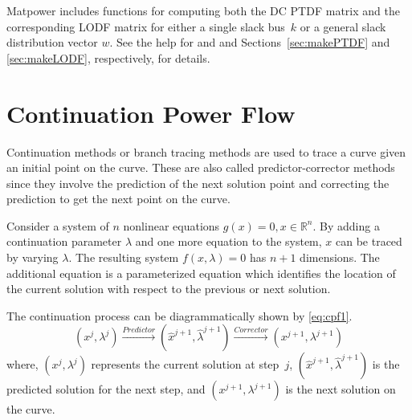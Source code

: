 \documentclass[12pt]{article}
\newcommand{\matpower}[0]{{\sc Matpower}}
\newcommand{\code}[1]{{\relsize{-0.5}{\tt{{#1}}}}}  %
\numberwithin{equation}{section}
\numberwithin{table}{section}
\numberwithin{figure}{section}
\begin{document}
\matpower{} includes functions for computing both the DC PTDF matrix and the corresponding LODF matrix for either a single slack bus~$k$ or a general slack distribution vector $w$. See the help for \code{makePTDF} and \code{makeLODF} and Sections~\ref{sec:makePTDF} and \ref{sec:makeLODF}, respectively, for details.


\clearpage
\section{Continuation Power Flow}

Continuation methods or branch tracing methods are used to trace a curve given an initial point on the curve. These are also called predictor-corrector methods since they involve the prediction of the next solution point and correcting the prediction to get the next point on the curve.

Consider a system of $n$ nonlinear equations $g(x) = 0, x \in \mathbb{R}^n$. By adding a continuation parameter $\lambda$ and one more equation to the system, $x$ can be traced by varying $\lambda$. The resulting system $f(x,\lambda)=0$ has $n + 1$ dimensions. The additional equation is a parameterized equation which identifies the location of the current solution with respect to the previous or next solution.

The continuation process can be diagrammatically shown by \eqref{eq:cpf1}.
\begin{equation}
\left(x^j,\lambda^j\right) \xrightarrow{Predictor} (\hat{x}^{j+1},\hat{\lambda}^{j+1}) \xrightarrow{Corrector} \left({x}^{j+1},{\lambda}^{j+1}\right)
\label{eq:cpf1}
\end{equation}
where, $\left(x^j,\lambda^j\right)$ represents the current solution at step~$j$, $(\hat{x}^{j+1},\hat{\lambda}^{j+1})$ is the predicted solution for the next step, and $({x}^{j+1},{\lambda}^{j+1})$ is the next solution on the curve.
\end{document}
